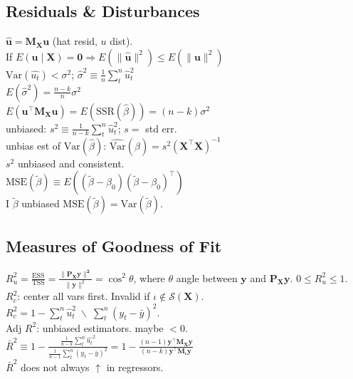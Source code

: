 \subsection*{Residuals \& Disturbances}
$\mathbf{\hat{u}} = \mathbf{M_X u}$ (hat resid, $u$ dist).\\
If $E(\mathbf{u}\mid \mathbf{X}) = \mathbf{0} \Rightarrow E(\lVert \mathbf{\hat{u}} \rVert ^2) \leq E(\lVert \mathbf{u} \rVert ^2)$\\
$\text{Var}(\hat{u_t}) < \sigma^2$; $\hat{\sigma}^2 \equiv \frac{1}{n} \sum_{t}^{n} \hat{u}_t ^2$\\
$E(\hat{\sigma}^2) = \frac{n-k}{n}\sigma^2$\\
$E(\mathbf{u^{\top}M_X u}) = E(\text{SSR}(\hat{\beta})) = (n-k)\sigma^2$\\
unbiased: $s^2 \equiv \frac{1}{n-k}\sum_{t}^{n} \hat{u}_t ^2$; $s=$ std err.\\
unbias est of $\text{Var}(\hat{\beta})$: $\widehat{\text{Var}}(\hat{\beta})=s^2(\mathbf{X^{\top}X})^{-1}$\\
$s^2$ unbiased and consistent.\\
$\text{MSE}(\tilde{\beta}) \equiv E((\tilde{\beta} - \beta_0)(\tilde{\beta} - \beta_0)^{\top})$\\
I $\tilde{\beta}$ unbiased $\text{MSE}(\tilde{\beta}) = \text{Var}(\tilde{\beta})$.
\subsection*{Measures of Goodness of Fit}
$R_{u}^2 = \frac{\text{ESS}}{\text{TSS}}= \frac{\lVert \mathbf{P_X y \rVert^2}}{\lVert \mathbf{y} \rVert^2} = \cos^2 \theta$, where $\theta$ angle between $\mathbf{y}$ and $\mathbf{P_X y}$.
$0 \leq R^2_{u} \leq 1$.\\
$R_{c}^2$: center all vars first.
Invalid if $\iota \notin \mathcal{S}(\mathbf{X})$.\\
$R_{c}^2 = 1 - \sum_{t}^{n} \hat{u}_t ^2 \; \backslash \; \sum_{t}^{n} (y_t - \bar{y})^2$.\\
Adj $R^2$: unbiased estimators.
maybe $< 0$.\\
$\bar{R}^2 \equiv 1- \frac{\frac{1}{n-k}\sum_{t}^{n} \hat{u_t}^2}{\frac{1}{n-1}\sum_{t}^{n}(y_t - \bar{y})^2} = 1 - \frac{(n-1)\mathbf{y^{\top}M_X y}}{(n-k)\mathbf{y^{\top}M_\iota y}}$\\
$\bar{R}^2$ does not always $\uparrow$ in regressors.
